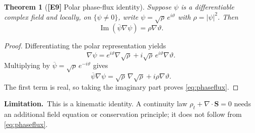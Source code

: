 \documentclass[11pt,letterpaper]{article}
\newtheorem{theorem}{Theorem}[section]
\theoremstyle{definition}
\theoremstyle{remark}
\newcommand{\abs}[1]{\left\lvert#1\right\rvert}
\newcommand{\id}[1]{\textnormal{\textbf{[#1]}}}
\newcommand{\scope}{\par\smallskip\noindent\textbf{Limitation.}\ }
\begin{document}
\begin{theorem}[\id{E9} Polar phase-flux identity]\label{thm:phaseflux}
Suppose $\psi$ is a differentiable complex field and locally, on
$\{\psi\ne0\}$, write $\psi=\sqrt\rho\,e^{i\vartheta}$ with
$\rho=\abs\psi^2$. Then
\begin{equation}\label{eq:phaseflux}
\boxed{\operatorname{Im}(\overline\psi\nabla\psi)
=\rho\nabla\vartheta}.
\end{equation}
\end{theorem}
\begin{proof}
Differentiating the polar representation yields
\begin{equation*}
\nabla\psi=e^{i\vartheta}\nabla\sqrt\rho
+i\sqrt\rho\,e^{i\vartheta}\nabla\vartheta.
\end{equation*}
Multiplying by $\overline\psi=\sqrt\rho\,e^{-i\vartheta}$ gives
\begin{equation*}
\overline\psi\nabla\psi
=\sqrt\rho\,\nabla\sqrt\rho+i\rho\nabla\vartheta.
\end{equation*}
The first term is real, so taking the imaginary part proves
\eqref{eq:phaseflux}.
\end{proof}
\scope This is a kinematic identity. A continuity law
$\rho_t+\nabla\cdot\mathbf S=0$ needs an additional field equation or
conservation principle; it does not follow from \eqref{eq:phaseflux}.
\end{document}
